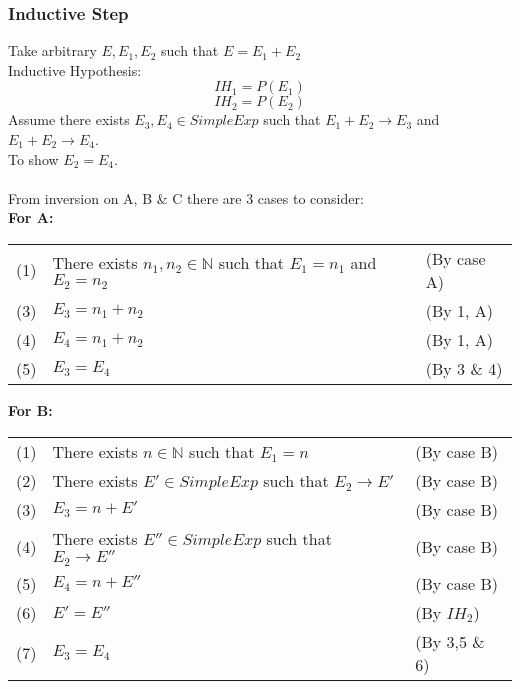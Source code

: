 \documentclass{report}
\begin{document}
            \subsubsection*{Inductive Step}
                Take arbitrary $E, E_1,E_2$ such that $E = E_1 + E_2$
                \\ Inductive Hypothesis:
                \[IH_1 = P(E_1)\]
                \[IH_2 = P(E_2)\]
                Assume there exists $E_3, E_4 \in SimpleExp$ such that $E_1 + E_2 \to E_3$ and $E_1 + E_2 \to E_4$.
                \\ To show $E_2 = E_4$.
                \\
                \\ From inversion on A, B \& C there are 3 cases to consider:
                \\ \textbf{For A:}
                \begin{center}
                    \begin{tabular}{l l l}
                        (1) & There exists $n_1, n_2 \in \mathbb{N}$ such that $E_1 = n_1$ and $E_2 = n_2$ & (By case A) \\
                        (3) & $E_3 = n_1 + n_2$ & (By 1, A) \\
                        (4) & $E_4 = n_1 + n_2$ & (By 1, A) \\
                        (5) & $E_3 = E_4$ & (By 3 \& 4) \\
                    \end{tabular}
                \end{center}
                \textbf{For B:}
                \begin{center}
                    \begin{tabular}{l l l}
                        (1) & There exists $n \in \mathbb{N}$ such that $E_1 = n$ & (By case B) \\
                        (2) & There exists $E' \in SimpleExp$ such that $E_2 \to E'$ & (By case B) \\
                        (3) & $E_3 = n + E'$ & (By case B) \\
                        (4) & There exists $E'' \in SimpleExp$ such that $E_2 \to E''$ & (By case B) \\
                        (5) & $E_4 = n + E''$ & (By case B) \\
                        (6) & $E' = E''$ & (By $IH_2$) \\
                        (7) & $E_3 = E_4$ & (By 3,5 \& 6) \\
                    \end{tabular}
                \end{center}
\end{document}
